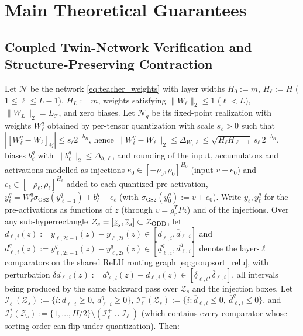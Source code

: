 \section{Main Theoretical Guarantees}
\label{sec:theory}

\subsection{Coupled Twin-Network Verification and Structure-Preserving Contraction}

\begin{proposition}
\label{prop:twin_crown}
Let \(\mathcal{N}\) be the network \eqref{eq:teacher_weights} with layer widths \(H_0 := m\), \(H_\ell := H\) (\(1 \le \ell \le L-1\)), \(H_L := m\), weights satisfying \(\|W_\ell\|_2 \le 1\) (\(\ell < L\)), \(\|W_L\|_2 = L_{\mathcal{T}}\), and zero biases. Let \(\mathcal{N}_q\) be its fixed-point realization with weights \(W_\ell^q\) obtained by per-tensor quantization with scale \(s_\ell > 0\) such that \(|[W_\ell^q - W_\ell]_{ij}| \le s_\ell 2^{-b_B}\), hence
\(\|W_\ell^q - W_\ell\|_2 \le \Delta_{W,\ell} \le \sqrt{H_\ell H_{\ell-1}}\,s_\ell\,2^{-b_B}\), biases \(b_\ell^q\) with \(\|b_\ell^q\|_2 \le \Delta_{b,\ell}\), and rounding of the input, accumulators and activations modelled as injections \(e_0 \in [-\rho_0,\rho_0]^{H_0}\) (input \(v + e_0\)) and \(e_\ell \in [-\rho_\ell, \rho_\ell]^{H_\ell}\) added to each quantized pre-activation, \(y_\ell^q = W_\ell^q\sigma_{\mathrm{GS2}}(y_{\ell-1}^q) + b_\ell^q + e_\ell\) (with \(\sigma_{\mathrm{GS2}}(y_0^q) := v + e_0\)). Write \(y_\ell, y_\ell^q\) for the pre-activations as functions of \(z\) (through \(v = g_r^TPz\)) and of the injections. Over any sub-hyperrectangle \(\mathcal{Z}_s = [\underline{z}_s, \overline{z}_s] \subset \mathcal{Z}_{\mathrm{ODD}}\), let \(d_{\ell,i}(z) := y_{\ell,2i-1}(z) - y_{\ell,2i}(z) \in [\underline{d}_{\ell,i}, \overline{d}_{\ell,i}]\) and \(d_{\ell,i}^q(z) := y_{\ell,2i-1}^q(z) - y_{\ell,2i}^q(z) \in [\underline{d}_{\ell,i}^q, \overline{d}_{\ell,i}^q]\) denote the layer-\(\ell\) comparators on the shared ReLU routing graph \eqref{eq:groupsort_relu}, with perturbation \(\delta d_{\ell,i}(z) := d_{\ell,i}^q(z) - d_{\ell,i}(z) \in [\underline{\delta}_{\ell,i}, \overline{\delta}_{\ell,i}]\), all intervals being produced by the same backward pass over \(\mathcal{Z}_s\) and the injection boxes. Let \(\mathcal{I}_\ell^+(\mathcal{Z}_s) := \{i : \underline{d}_{\ell,i} \ge 0,\ \underline{d}^q_{\ell,i} \ge 0\}\), \(\mathcal{I}_\ell^-(\mathcal{Z}_s) := \{i : \overline{d}_{\ell,i} \le 0,\ \overline{d}^q_{\ell,i} \le 0\}\), and \(\mathcal{I}_\ell^*(\mathcal{Z}_s) := \{1,\dots,H/2\}\setminus(\mathcal{I}_\ell^+ \cup \mathcal{I}_\ell^-)\) (which contains every comparator whose sorting order can flip under quantization). Then:

\end{proposition}
